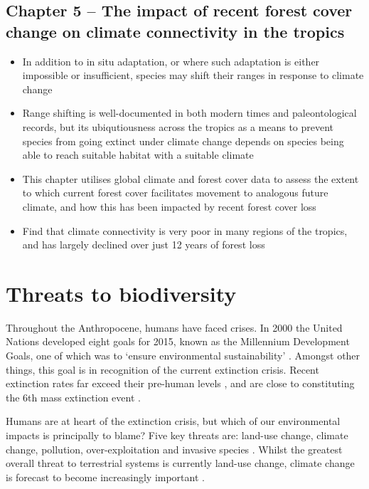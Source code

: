 \documentclass[12pt,a4paper,]{report}
\providecommand{\tightlist}{%
  \setlength{\itemsep}{0pt}\setlength{\parskip}{0pt}}
\theoremstyle{definition}
\theoremstyle{definition}
\theoremstyle{definition}
\theoremstyle{remark}
\begin{document}
\subsection{Chapter 5 -- The impact of recent forest cover change on
climate connectivity in the
tropics}\label{chapter-5-the-impact-of-recent-forest-cover-change-on-climate-connectivity-in-the-tropics}

\begin{itemize}
\tightlist
\item
  In addition to in situ adaptation, or where such adaptation is either
  impossible or insufficient, species may shift their ranges in response
  to climate change
\item
  Range shifting is well-documented in both modern times and
  paleontological records, but its ubiqutiousness across the tropics as
  a means to prevent species from going extinct under climate change
  depends on species being able to reach suitable habitat with a
  suitable climate
\item
  This chapter utilises global climate and forest cover data to assess
  the extent to which current forest cover facilitates movement to
  analogous future climate, and how this has been impacted by recent
  forest cover loss
\item
  Find that climate connectivity is very poor in many regions of the
  tropics, and has largely declined over just 12 years of forest loss
\end{itemize}

\section{Threats to biodiversity}\label{threats-to-biodiversity-1}

Throughout the Anthropocene, humans have faced crises. In 2000 the
United Nations developed eight goals for 2015, known as the Millennium
Development Goals, one of which was to `ensure environmental
sustainability' \citep{united_nations_united_2014}. Amongst other
things, this goal is in recognition of the current extinction crisis.
Recent extinction rates far exceed their pre-human levels
\citep{pimm_future_1995}, and are close to constituting the 6th mass
extinction event \citep{barnosky_has_2011}.

Humans are at heart of the extinction crisis, but which of our
environmental impacts is principally to blame? Five key threats are:
land-use change, climate change, pollution, over-exploitation and
invasive species \citep{hirsch_global_2010}. Whilst the greatest overall
threat to terrestrial systems is currently land-use change, climate
change is forecast to become increasingly important
\citep{sala_global_2000}.
\end{document}
